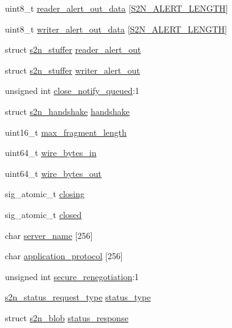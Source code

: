 \begin{DoxyCompactItemize}
\item 
uint8\+\_\+t \hyperlink{structs2n__connection_a3e8c16136106e623cd0ee50701aaf141}{reader\+\_\+alert\+\_\+out\+\_\+data} \mbox{[}\hyperlink{s2n__tls__parameters_8h_acf0815e20ae2239c2542f1a429c3dda1}{S2\+N\+\_\+\+A\+L\+E\+R\+T\+\_\+\+L\+E\+N\+G\+TH}\mbox{]}
\item 
uint8\+\_\+t \hyperlink{structs2n__connection_a950afe753c3200576cd4b083404a2e5a}{writer\+\_\+alert\+\_\+out\+\_\+data} \mbox{[}\hyperlink{s2n__tls__parameters_8h_acf0815e20ae2239c2542f1a429c3dda1}{S2\+N\+\_\+\+A\+L\+E\+R\+T\+\_\+\+L\+E\+N\+G\+TH}\mbox{]}
\item 
struct \hyperlink{structs2n__stuffer}{s2n\+\_\+stuffer} \hyperlink{structs2n__connection_a00dd2a749a85d247561da67ec248d3e1}{reader\+\_\+alert\+\_\+out}
\item 
struct \hyperlink{structs2n__stuffer}{s2n\+\_\+stuffer} \hyperlink{structs2n__connection_a6168f6d8f8b3d65bc1d566091149ddf4}{writer\+\_\+alert\+\_\+out}
\item 
unsigned int \hyperlink{structs2n__connection_a1ba9fe08a4f37494def44e02d95a2ffa}{close\+\_\+notify\+\_\+queued}\+:1
\item 
struct \hyperlink{structs2n__handshake}{s2n\+\_\+handshake} \hyperlink{structs2n__connection_a902584c57c26269c7cbf42e4770ed356}{handshake}
\item 
uint16\+\_\+t \hyperlink{structs2n__connection_aeb12fafca93fad21fd9b32d31f192ea6}{max\+\_\+fragment\+\_\+length}
\item 
uint64\+\_\+t \hyperlink{structs2n__connection_ae40976768561ff646c1b9badadcd4f4e}{wire\+\_\+bytes\+\_\+in}
\item 
uint64\+\_\+t \hyperlink{structs2n__connection_ad34101c7be957b19718d9e9047e1af39}{wire\+\_\+bytes\+\_\+out}
\item 
sig\+\_\+atomic\+\_\+t \hyperlink{structs2n__connection_afaf913ae0bd2fe2866608f51060791a2}{closing}
\item 
sig\+\_\+atomic\+\_\+t \hyperlink{structs2n__connection_a9e746c5b2dde4a77b710780924853c2f}{closed}
\item 
char \hyperlink{structs2n__connection_aaeec7205ccf6834a5eaf18d9a5eb8936}{server\+\_\+name} \mbox{[}256\mbox{]}
\item 
char \hyperlink{structs2n__connection_a826afa0c257cdb351d45ca87c734ec3c}{application\+\_\+protocol} \mbox{[}256\mbox{]}
\item 
unsigned int \hyperlink{structs2n__connection_a579beb899db6aa0c25366672938b2216}{secure\+\_\+renegotiation}\+:1
\item 
\hyperlink{s2n_8h_a7d38e45340d223d0100a2d4bc0526635}{s2n\+\_\+status\+\_\+request\+\_\+type} \hyperlink{structs2n__connection_a0dd734711814c74b9bb3d920187cfe3a}{status\+\_\+type}
\item 
struct \hyperlink{structs2n__blob}{s2n\+\_\+blob} \hyperlink{structs2n__connection_ab3cd78ec62aea98bf900913bb379d523}{status\+\_\+response}
\end{DoxyCompactItemize}


